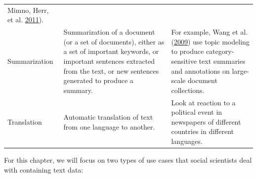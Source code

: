 \documentclass[]{krantz}
\begin{document}
\begin{longtable}[]{@{}lll@{}}
\begin{minipage}[t]{0.63\columnwidth}
Mimno, Herr, et al.
\protect\hyperlink{ref-EdmundMTalley2011}{2011}).\strut
\end{minipage}\tabularnewline
\begin{minipage}[t]{0.12\columnwidth}\raggedright\strut
Summarization\strut
\end{minipage} & \begin{minipage}[t]{0.16\columnwidth}\raggedright\strut
Summarization of a document (or a set of documents), either as a set of
important keywords, or important sentences extracted from the text, or
new sentences generated to produce a summary.\strut
\end{minipage} & \begin{minipage}[t]{0.63\columnwidth}\raggedright\strut
For example, Wang et al. (\protect\hyperlink{ref-wang-09}{2009}) use
topic modeling to produce category-sensitive text summaries and
annotations on large-scale document collections.\strut
\end{minipage}\tabularnewline
\begin{minipage}[t]{0.12\columnwidth}\raggedright\strut
Translation\strut
\end{minipage} & \begin{minipage}[t]{0.16\columnwidth}\raggedright\strut
Automatic translation of text from one language to another.\strut
\end{minipage} & \begin{minipage}[t]{0.63\columnwidth}\raggedright\strut
Look at reaction to a political event in newspapers of different
countries in different languages.\strut
\end{minipage}\tabularnewline
\bottomrule
\end{longtable}

For this chapter, we will focus on two types of use cases that social
scientists deal with containing text data:
\end{document}

